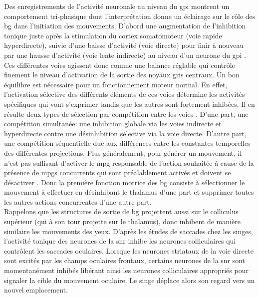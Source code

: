 Des enregistrements de l'activité neuronale au niveau du \gls{gpi} montrent un comportement tri-phasique dont l'interprétation donne un éclairage sur le rôle des \gls{bg} dans l'initiation des mouvements. D'abord une augmentation de l'inhibition tonique juste après la stimulation du cortex somatomoteur (voie rapide hyperdirecte), suivie d'une baisse d'activité (voie directe) pour finir à nouveau par une hausse d'activité (voie lente indirecte) au niveau d'un neurone du \gls{gpi} \cite{Nambu:2008}.\\

Ces différentes voies agissent donc comme une balance réglable qui contrôle finement le niveau d'activation de la sortie des noyaux gris centraux. Un bon équilibre est nécessaire pour un fonctionnement moteur normal. En effet, l'activation sélective des différents éléments de ces voies détermine les activités spécifiques qui vont s'exprimer tandis que les autres sont fortement inhibées. Il en résulte deux types de sélection par compétition entre les voies \cite{Hikosaka:1993}. D'une part, une compétition simultanée: une inhibition globale via les voies indirecte et hyperdirecte contre une désinhibition sélective via la voie directe. D'autre part, une compétition séquentielle due aux différences entre les constantes temporelles des différentes projections. Plus généralement, pour générer un mouvement, il n'est pas suffisant d'activer le \gls{mpg} responsable de l'action souhaitée à cause de la présence de \glspl{mpg} concurrents qui sont préalablement activés et doivent se désactiver \cite{O:2006,Redgrave:1999}. Donc la première fonction motrice des \gls{bg} consiste à sélectionner le mouvement à effectuer en désinhibant le thalamus d'une part et supprimer toutes les autres actions concurrentes d'une autre part. \\

Rappelons que les structures de sortie de \gls{bg} projettent aussi sur le colliculus supérieur (qui à son tour projette sur le thalamus), donc inhibent de manière similaire les mouvements des yeux. D'après les études de saccades chez les singes, l'activité tonique des neurones de la \gls{snr} inhibe les neurones colliculaires qui contrôlent les saccades oculaires. Lorsque les neurones striataux de la voie directe sont excités par les champs oculaires frontaux, certains neurones de la \gls{snr} sont momentanément inhibés libérant ainsi les neurones colliculaires appropriés pour signaler la cible du mouvement oculaire. Le singe déplace alors son regard vers un nouvel emplacement.\\ 

